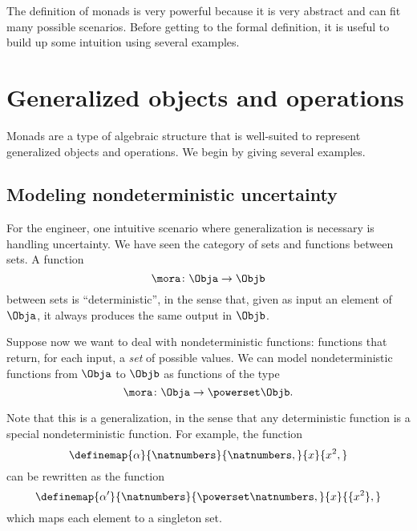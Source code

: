 

The definition of monads is very powerful because it is very abstract and can fit many possible scenarios. Before getting to the formal definition, it is useful to build up some intuition using several examples. 

\section{Generalized objects and operations}


Monads are a type of algebraic structure that is well-suited to represent generalized objects and operations. We begin by giving several examples. 


\subsection{Modeling nondeterministic uncertainty}

For the engineer, one intuitive scenario where generalization is necessary is handling uncertainty. 
We have seen the category  \Set of sets and functions between sets. A function 
\begin{equation}\label{eq:monad-simple}
    \mora\colon\Obja\to\Objb
\end{equation}
between sets is ``deterministic'', in the sense that, given as input an element of $\Obja$, it always produces the same output in $\Objb$. 

Suppose now we want to deal with nondeterministic functions: functions that return, for each input, a \emph{set} of possible values.  We can model nondeterministic functions from $\Obja$ to $\Objb$ as functions of the type 
\begin{equation}\label{eq:monad-generalized}
    \mora\colon\Obja\to\powerset\Objb.
\end{equation}

Note that this is a generalization, in the sense that any deterministic function is a special nondeterministic function. 
For example, the function
% 
\begin{equation}\label{eq:monad-alpha-example1}
    \definemap{\alpha}{\natnumbers}{\natnumbers,}%
    {x}{x^2,}
\end{equation}
% 
can be rewritten as the function
% 
\begin{equation}\label{eq:monad-alpha-example2}
    \definemap{\alpha'}{\natnumbers}{\powerset\natnumbers,}%
    {x}{\{x^2\},}
\end{equation}
% 
which maps each element to a singleton set.

